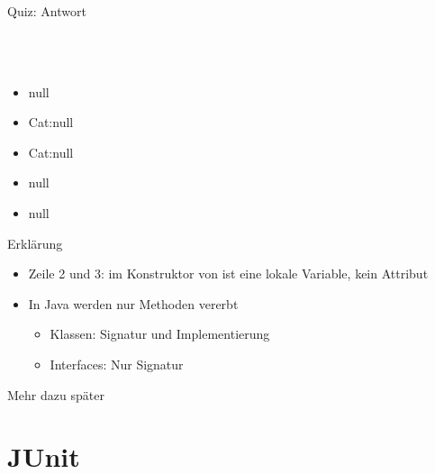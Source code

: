 \documentclass[usepdftitle=false,hyperref={pdfpagelabels=false}]{beamer}
\begin{document}
\begin{frame}{Quiz: Antwort}
    \begin{minipage}[b]{0.45\linewidth}
        \inputminted[linenos=false, numbersep=5pt, tabsize=4, fontsize=\tiny, label=Animal.java, frame=lines]{java}{Animal.java}
        \inputminted[linenos=false, numbersep=5pt, tabsize=4, fontsize=\tiny, label=Jungle.java, frame=lines]{java}{Jungle.java}
    \end{minipage}
    \hspace{0.5cm}
    \begin{minipage}[b]{0.45\linewidth}
        \inputminted[linenos=false, numbersep=5pt, tabsize=4, fontsize=\tiny, label=Tiger.java, frame=lines]{java}{Tiger.java}
        \inputminted[linenos=false, numbersep=5pt, tabsize=4, fontsize=\tiny, label=Cat.java, frame=lines]{java}{Cat.java}
        \begin{itemize}
            \item null
            \item Cat:null
            \item Cat:null
            \item null
            \item null
        \end{itemize}
    \end{minipage}
\end{frame}

\begin{frame}{Erklärung}
    \begin{itemize}
        \item Zeile 2 und 3:  im Konstruktor von  ist eine
              lokale Variable, kein Attribut
        \item In Java werden nur Methoden vererbt
            \begin{itemize}
                \item Klassen: Signatur und Implementierung
                \item Interfaces: Nur Signatur
            \end{itemize}
    \end{itemize}

    Mehr dazu später
\end{frame}

\section{JUnit}
\end{document}
